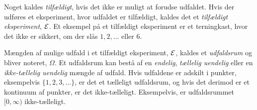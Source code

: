 

%








Noget kaldes \textit{tilfældigt}, hvis det ikke er muligt at forudse udfaldet. Hvis der udføres et eksperiment, hvor udfaldet er tilfældigt, kaldes det et \textit{tilfældigt eksperiment}, $\mathcal{E}$. Et eksempel på et tilfældigt eksperiment er et terningkast, hvor det ikke er sikkert, om der slås $1, 2, \dots$ eller $6$. %

Mængden af mulige udfald i et tilfældigt eksperiment, $\mathcal{E}$, kaldes et \textit{udfaldsrum} og bliver noteret, $\Omega$. Et udfaldsrum kan bestå af en \textit{endelig}, \textit{tællelig uendelig} eller en \textit{ikke-tællelig uendelig} mængde af udfald. Hvis udfaldene er adskilt i punkter, eksempelvis $\{1,2,3, \dots\}$, er det et tælleligt udfaldsrum, og hvis det derimod er et kontinuum af punkter, er det ikke-tælleligt. Eksempelvis, er udfaldsrummet $[0, \infty)$ ikke-tælleligt.


